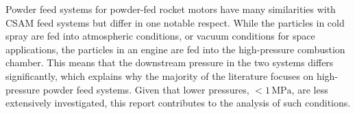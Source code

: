 Powder feed systems for powder-fed rocket motors have many similarities with CSAM feed systems but differ in one notable respect. While the particles in cold spray are fed into atmospheric conditions, or vacuum conditions for space applications, the particles in an engine are fed into the high-pressure combustion chamber. This means that the downstream pressure in the two systems differs significantly, which explains why the majority of the literature focuses on high-pressure powder feed systems. Given that lower pressures, $<1\,\mathrm{MPa}$, are less extensively investigated, this report contributes to the analysis of such conditions.

